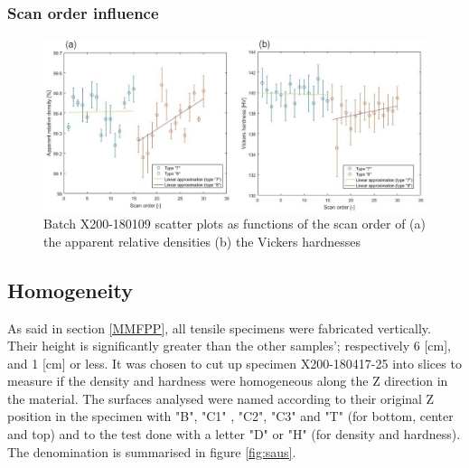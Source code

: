 \subsubsection{Scan order influence}


\begin{figure}[ht]
\centering
\centerline{\includegraphics[scale=0.62]{Images/180109-SO}}
\decoRule
\caption[Batch X200-180109 scatter plots as functions of the scan order of (a) the apparent relative densities (b) the Vickers hardnesses]{Batch X200-180109 scatter plots as functions of the scan order of (a) the apparent relative densities (b) the Vickers hardnesses}
\label{fig:180109-SO}
\end{figure} 

\subsection{Homogeneity}
As said in section \ref{MMFPP}, all tensile specimens were fabricated vertically. Their height is significantly greater than the other samples'; respectively 6 [cm], and 1 [cm] or less. It was chosen to cut up specimen X200-180417-25 into slices to measure if the density and hardness were homogeneous along the Z direction in the material. The surfaces analysed were named according to their original Z position in the specimen with "B", "C1" , "C2", "C3" and "T" (for bottom, center and top) and to the test done with a letter "D" or "H"  (for density and hardness). The denomination is summarised in figure \ref{fig:saus}.\\

